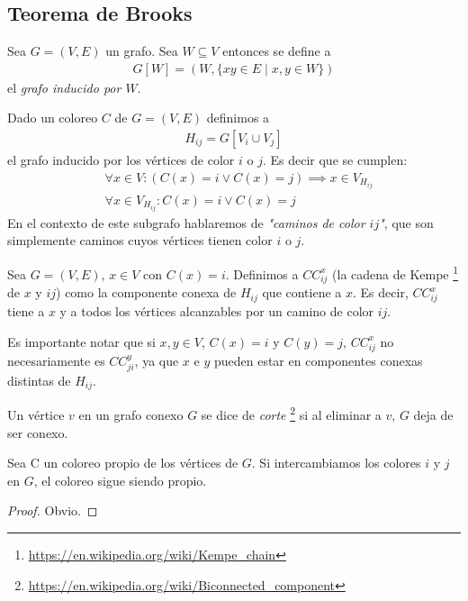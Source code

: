 \subsection{Teorema de Brooks}

\begin{definition}
  Sea $G = (V, E)$ un grafo. Sea $W \subseteq V$ entonces se define a
  \begin{align}
    G[W] = \left(W, \{xy \in E \mid x,y \in W\}\right)
  \end{align}
  el \emph{grafo inducido por $W$}.
\end{definition}

\begin{definition}
Dado un coloreo $C$ de $G = (V,E)$ definimos a
\begin{align}
    H_{ij} = G\left[V_i \cup V_j\right]
\end{align}
el grafo inducido por los vértices de color $i$ o $j$.
Es decir que se cumplen:
\begin{align}
    &\forall x \in V \colon (C(x) = i \vee C(x) = j) \implies x \in V_{H_{ij}}\\
    &\forall x \in V_{H_{ij}} \colon C(x) = i \vee C(x) = j
\end{align}
En el contexto de este subgrafo hablaremos de \emph{"caminos de color $ij$"}, que son simplemente caminos cuyos vértices tienen color $i$ o $j$.
\end{definition}

\begin{definition}
Sea $G = (V, E)$, $x \in V$ con $C(x) = i$. Definimos a $CC^x_{ij}$ (la cadena de Kempe \footnote{\url{https://en.wikipedia.org/wiki/Kempe_chain}} de $x$ y $ij$) como la componente conexa de $H_{ij}$ que contiene a $x$.
Es decir, $CC^x_{ij}$ tiene a $x$ y a todos los vértices alcanzables por un camino de color $ij$.

Es importante notar que si $x,y \in V$, $C(x) = i$ y $C(y) = j$, $CC^x_{ij}$ no necesariamente es $CC^y_{ji}$, ya que $x$ e $y$ pueden estar en componentes conexas distintas de $H_{ij}$.
\end{definition}

\begin{definition}
Un vértice $v$ en un grafo conexo $G$ se dice de \emph{corte} \footnote{\url{https://en.wikipedia.org/wiki/Biconnected_component}} si al eliminar a $v$, $G$ deja de ser conexo.
\end{definition}

\begin{lemma}\label{lema1}
Sea C un coloreo propio de los vértices de $G$. Si intercambiamos los colores $i$ y $j$ en $G$, el coloreo sigue siendo propio.
\end{lemma}
\begin{proof}
Obvio.
\end{proof}

